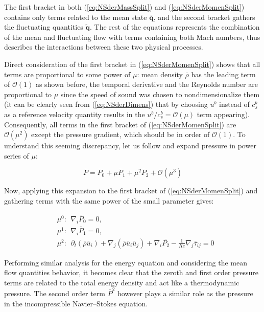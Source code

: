 The first bracket in both (\ref{eq:NSderMassSplit}) and (\ref{eq:NSderMomenSplit}) contains only terms related to the mean state $\bar{\mathbf{q}}$, and the second bracket gathers the fluctuating quantities $\tilde{\mathbf{q}}$. The rest of the equations represents the combination of the mean and fluctuating flow with terms containing both Mach numbers, thus describes the interactions between these two physical processes.

Direct consideration of the first bracket in (\ref{eq:NSderMomenSplit}) shows that all terms are proportional to some power of $\mu$: mean density $\bar{\rho}$ has the leading term of $\mathcal{O}(1)$ as shown before, the temporal derivative and the Reynolds number are proportional to $\mu$ since the speed of sound was chosen to nondimensionalize them (it can be clearly seen from (\ref{eq:NSderDimens}) that by choosing $u^b$ instead of $c_s^b$ as a reference velocity quantity results in the $u^b/c_s^b = \mathcal{O}(\mu)$ term appearing). Consequently, all terms in the first bracket of (\ref{eq:NSderMomenSplit}) are $\mathcal{O}(\mu^2)$ except the pressure gradient, which should be in order of $\mathcal{O}(1)$. To understand this seeming discrepancy, let us follow \cite{Muller99lowmach} and expand pressure in power series of $\mu$:

\begin{equation}
\bar{P} = \bar{P}_0 + \mu \bar{P}_1 + \mu^2 \bar{P}_2 + \mathcal{O}(\mu^3)
\end{equation}

Now, applying this expansion to the first bracket of (\ref{eq:NSderMomenSplit}) and gathering terms with the same power of the small parameter gives:

\begin{subequations}
\begin{flalign}
    &\mu^0: \ \ \nabla_i \bar{P}_0 = 0, \\&
    \mu^1: \ \ \nabla_i \bar{P}_1 = 0, \\&
    \mu^2: \ \ \partial_t  (\bar{\rho} \bar{u}_i) + \nabla_j (\bar{\rho} \bar{u}_i\bar{u}_j) + \nabla_i \bar{P_2} - \frac{1}{Re} \nabla_j \bar{\tau}_{ij} = 0
\end{flalign}
\end{subequations}

Performing similar analysis for the energy equation and considering the mean flow quantities behavior, it becomes clear that the zeroth and first order pressure terms are related to the total energy density and act like a thermodynamic pressure. The second order term $\bar{P}^2$ however plays a similar role as the pressure in the incompressible Navier--Stokes equation.

